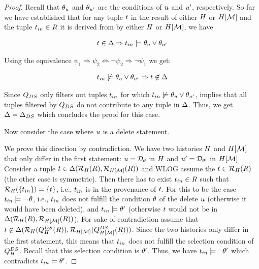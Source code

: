 \begin{proof}
 Recall that $\theta_{u}$ and $\theta_{u'}$  are the conditions of $u$ and $u'$, respectively.  So far we have established that for any tuple $t$ in the result of either $H$ or $H[\mathcal{M}]$ and the tuple $t_{in} \in R$ it is derived from by either $H$ or $H[\mathcal{M}]$, we have

 \begin{align}
t \in \Delta \Rightarrow t_{in} \models \theta_{u} \lor \theta_{u'}
 \end{align}

Using the equivalence $\psi_1 \Rightarrow \psi_2 \Leftrightarrow \neg \psi_2 \Rightarrow \neg \psi_1$ we get:

 \begin{align}
   t_{in} \not\models \theta_{u} \lor \theta_{u'} \Rightarrow t \not\in \Delta
    \label{eq:update-slicing-cond}
 \end{align}

Since $Q_{DS}$ only filters out tuples $t_{in}$ for which $t_{in} \not \models \theta_{u} \lor \theta_{u'}$,   implies that all tuples filtered by $Q_{DS}$ do not contribute to any tuple in $\Delta$. Thus, we get $\Delta = \Delta_{DS}$ which concludes the proof for this case.


%
%
%
%
%
%
%

%

%
%
%
%
%

\proofpar{$\up = \adelete$:}
%
%
Now consider the case where $u$ is a delete statement.


\proofpar{$\dfull \subseteq \dslice$:}
%
  We prove this direction by contradiction. We have two histories $H$ and $H[\mathcal{M}]$ that only differ in the first statement: $u = \mathcal{D}_{\theta}$ in $H$ and $u' = \mathcal{D}_{\theta'}$ in $H[\mathcal{M}]$.
%
  Consider  a tuple $t \in   \Delta(\mathcal{R}_{H}(R),\mathcal{R}_{H[\mathcal{M}]}(R))$ and WLOG assume the $t \in \mathcal{R}_{H}(R)$ (the other case is symmetric). Then there has to exist $t_{in} \in R$ such that $\mathcal{R}_{H}(\{t_{in}\}) = \{ t \}$, i.e., $t_{in}$ is in the provenance of $t$. For this to be the case $t_{in} \models \neg\,\theta$, i.e.,  $t_{in}$ does not fulfill the condition $\theta$ of the delete $u$ (otherwise it would have been deleted), and $t_{in} \models \theta'$ (otherwise $t$ would not be in $\Delta(\mathcal{R}_{H}(R),\mathcal{R}_{H[\mathcal{M}]}(R))$).
  For sake of contradiction assume that $t \not \in \Delta(\mathcal{R}_{H}(Q_{H}^{DS}(R)),\mathcal{R}_{H[\mathcal{M}]}(Q_{H[\mathcal{M}]}^{DS}(R)))$. Since the two histories only differ in the first statement, this means that $t_{in}$ does not fulfill the selection condition of $Q_{H}^{DS}$. Recall that this selection condition is $\theta'$. Thus, we have $t_{in} \models \neg \theta'$ which contradicts $t_{in} \models \theta'$.


\end{proof}
